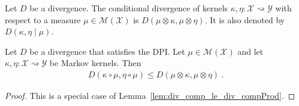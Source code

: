 \begin{definition}
  \label{def:condDiv}
  Let $D$ be a divergence.
  The conditional divergence of kernels $\kappa, \eta : \mathcal X \rightsquigarrow \mathcal Y$ with respect to a measure $\mu \in \mathcal M(\mathcal X)$ is $D(\mu \otimes \kappa, \mu \otimes \eta)$. It is also denoted by $D(\kappa, \eta \mid \mu)$.
\end{definition}


\begin{lemma}
  \label{lem:}
  Let $D$ be a divergence that satisfies the DPI. Let $\mathcal \mu \in \mathcal M(\mathcal X)$ and let $\kappa, \eta : \mathcal X \rightsquigarrow \mathcal Y$ be Markov kernels. Then
  \begin{align*}
  D(\kappa \circ \mu, \eta \circ \mu) \le D(\mu \otimes \kappa, \mu \otimes \eta) \: .
  \end{align*}
\end{lemma}

\begin{proof}%
{}
This is a special case of Lemma~\ref{lem:div_comp_le_div_compProd}.
\end{proof}